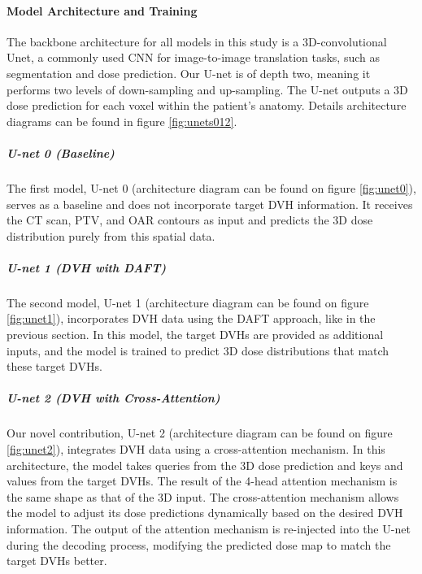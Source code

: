 \paragraph{Model Architecture and Training}
The backbone architecture for all models in this study is a 3D-convolutional Unet, a commonly used CNN for image-to-image translation tasks, such as segmentation and dose prediction.
Our U-net is of depth two, meaning it performs two levels of down-sampling and up-sampling.
The U-net outputs a 3D dose prediction for each voxel within the patient's anatomy.
Details architecture diagrams can be found in figure \ref{fig:unets012}.

\subparagraph{U-net 0 (Baseline)}
The first model, U-net 0 (architecture diagram can be found on figure \ref{fig:unet0}), serves as a baseline and does not incorporate target DVH information.
It receives the CT scan, PTV, and OAR contours as input and predicts the 3D dose distribution purely from this spatial data.

\subparagraph{U-net 1 (DVH with DAFT)}
The second model, U-net 1 (architecture diagram can be found on figure \ref{fig:unet1}), incorporates DVH data using the DAFT approach, like in the previous section.
In this model, the target DVHs are provided as additional inputs, and the model is trained to predict 3D dose distributions that match these target DVHs.

\subparagraph{U-net 2 (DVH with Cross-Attention)}
Our novel contribution, U-net 2 (architecture diagram can be found on figure \ref{fig:unet2}), integrates DVH data using a cross-attention mechanism.
In this architecture, the model takes queries from the 3D dose prediction and keys and values from the target DVHs.
The result of the 4-head attention mechanism is the same shape as that of the 3D input.
The cross-attention mechanism allows the model to adjust its dose predictions dynamically based on the desired DVH information.
The output of the attention mechanism is re-injected into the U-net during the decoding process, modifying the predicted dose map to match the target DVHs better.

